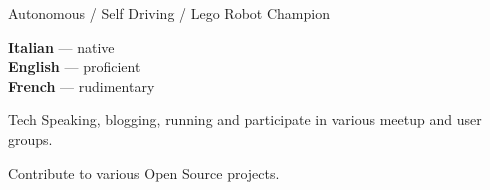 \documentclass[9pt]{developercv}
\begin{document}


\begin{entrylist}
		{Autonomous / Self Driving / Lego Robot Champion}
		{}
		{}
\end{entrylist}


\begin{minipage}[t]{0.3\textwidth}
	\vspace{-\baselineskip}


	\textbf{Italian} --- native\\
	\textbf{English} --- proficient\\
	\textbf{French} --- rudimentary
\end{minipage}
\hfill
\begin{minipage}[t]{0.3\textwidth}
	\vspace{-\baselineskip}


	Tech Speaking, blogging, running and participate in various meetup and user groups.
\end{minipage}
\hfill
\begin{minipage}[t]{0.3\textwidth}
	\vspace{-\baselineskip}


	Contribute to various Open Source projects.
\end{minipage}

\end{document}

